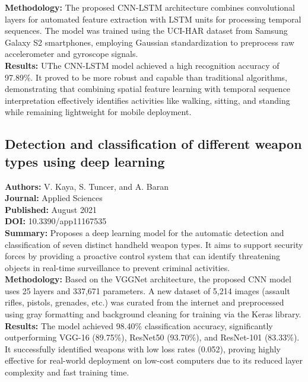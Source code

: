 \textbf{Methodology:} The proposed CNN-LSTM architecture combines convolutional layers for automated
feature extraction with LSTM units for processing temporal sequences. The model was trained using
the UCI-HAR dataset from Samsung Galaxy S2 smartphones, employing Gaussian standardization to
preprocess raw accelerometer and gyroscope signals. \\

\textbf{Results:} UThe CNN-LSTM model achieved a high recognition accuracy of 97.89\%. It proved to
be more robust and capable than traditional algorithms, demonstrating that combining spatial feature
learning with temporal sequence interpretation effectively identifies activities like walking,
sitting, and standing while remaining lightweight for mobile deployment.

\subsection{Detection and classification of different weapon types using deep learning}

\textbf{Authors:} V. Kaya, S. Tuncer, and A. Baran \\
\textbf{Journal:} Applied Sciences \\
\textbf{Published:} August 2021 \\
\textbf{DOI:} 10.3390/app11167535 \\

\textbf{Summary:} Proposes a deep learning model for the automatic detection and classification of
seven distinct handheld weapon types. It aims to support security forces by providing a proactive
control system that can identify threatening objects in real-time surveillance to prevent criminal
activities. \\

\textbf{Methodology:} Based on the VGGNet architecture, the proposed CNN model uses 25 layers and
337,671 parameters. A new dataset of 5,214 images (assault rifles, pistols, grenades, etc.) was
curated from the internet and preprocessed using gray formatting and background cleaning for
training via the Keras library. \\

\textbf{Results:} The model achieved 98.40\% classification accuracy, significantly outperforming
VGG-16 (89.75\%), ResNet50 (93.70\%), and ResNet-101 (83.33\%). It successfully identified weapons
with low loss rates (0.052), proving highly effective for real-world deployment on low-cost
computers due to its reduced layer complexity and fast training time.

